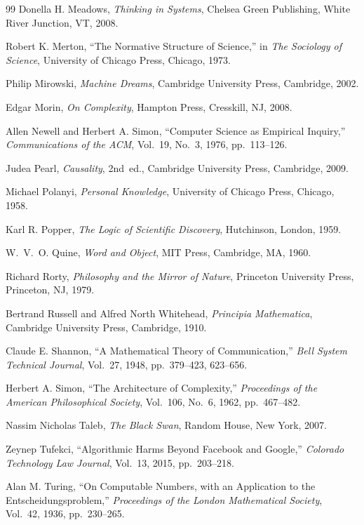 \documentclass[12pt, openright, twoside]{book}
\begin{document}
\begin{thebibliography}{99}
Donella H. Meadows,
\textit{Thinking in Systems},
Chelsea Green Publishing, White River Junction, VT, 2008.

Robert K. Merton,
``The Normative Structure of Science,''
in \textit{The Sociology of Science},
University of Chicago Press, Chicago, 1973.

Philip Mirowski,
\textit{Machine Dreams},
Cambridge University Press, Cambridge, 2002.

Edgar Morin,
\textit{On Complexity},
Hampton Press, Cresskill, NJ, 2008.

Allen Newell and Herbert A. Simon,
``Computer Science as Empirical Inquiry,''
\textit{Communications of the ACM},
Vol.~19, No.~3, 1976, pp.~113--126.

Judea Pearl,
\textit{Causality},
2nd~ed.,
Cambridge University Press, Cambridge, 2009.

Michael Polanyi,
\textit{Personal Knowledge},
University of Chicago Press, Chicago, 1958.

Karl R. Popper,
\textit{The Logic of Scientific Discovery},
Hutchinson, London, 1959.

W.~V.~O. Quine,
\textit{Word and Object},
MIT Press, Cambridge, MA, 1960.

Richard Rorty,
\textit{Philosophy and the Mirror of Nature},
Princeton University Press, Princeton, NJ, 1979.

Bertrand Russell and Alfred North Whitehead,
\textit{Principia Mathematica},
Cambridge University Press, Cambridge, 1910.

Claude E. Shannon,
``A Mathematical Theory of Communication,''
\textit{Bell System Technical Journal},
Vol.~27, 1948, pp.~379--423, 623--656.

Herbert A. Simon,
``The Architecture of Complexity,''
\textit{Proceedings of the American Philosophical Society},
Vol.~106, No.~6, 1962, pp.~467--482.

Nassim Nicholas Taleb,
\textit{The Black Swan},
Random House, New York, 2007.

Zeynep Tufekci,
``Algorithmic Harms Beyond Facebook and Google,''
\textit{Colorado Technology Law Journal},
Vol.~13, 2015, pp.~203--218.

Alan M. Turing,
``On Computable Numbers, with an Application to the Entscheidungsproblem,''
\textit{Proceedings of the London Mathematical Society},
Vol.~42, 1936, pp.~230--265.


\end{thebibliography}
\end{document}
